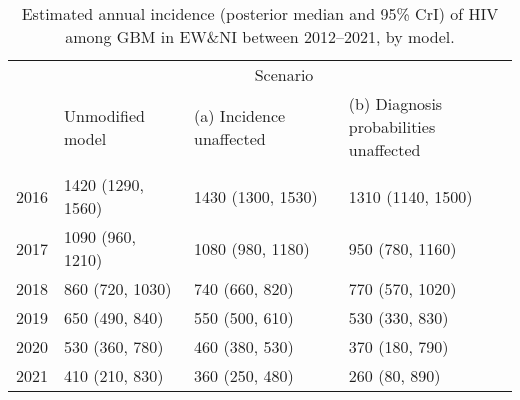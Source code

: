 \begin{table}[!h]
\centering\centering
\caption{\label{tab:counterfactual_inc_annual}Estimated annual incidence (posterior median and 95\% CrI) of HIV among GBM in EW\&NI between 2012--2021, by model.}
\centering
\begin{tabular}[t]{rlll}
\toprule
\multicolumn{1}{c}{ } & \multicolumn{3}{c}{Scenario} \\
\cmidrule(l{3pt}r{3pt}){2-4}
  & Unmodified model & (a) Incidence unaffected & \makecell[l]{(b) Diagnosis probabilities\\unaffected}\\
\midrule
\addlinespace[0.3em]
\multicolumn{4}{l}{Year}\\
\hspace{1em}2016 & 1420 (1290, 1560) & 1430 (1300, 1530) & 1310 (1140, 1500)\\
\hspace{1em}2017 & 1090 (960, 1210) & 1080 (980, 1180) & 950 (780, 1160)\\
\hspace{1em}2018 & 860 (720, 1030) & 740 (660, 820) & 770 (570, 1020)\\
\hspace{1em}2019 & 650 (490, 840) & 550 (500, 610) & 530 (330, 830)\\
\hspace{1em}2020 & 530 (360, 780) & 460 (380, 530) & 370 (180, 790)\\
\hspace{1em}2021 & 410 (210, 830) & 360 (250, 480) & 260 (80, 890)\\
\bottomrule
\end{tabular}
\end{table}
